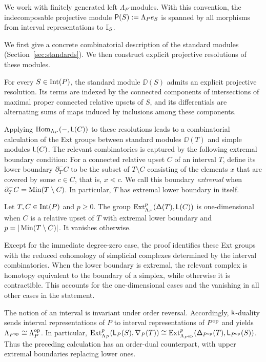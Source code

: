 We work with finitely generated left $\Lambda_P$-modules.  With this
convention, the indecomposable projective module
$\mathsf P(S):=\Lambda_Pe_S$ is spanned by all morphisms from interval representations to $\mathbb I_S$.

We first give a concrete combinatorial description of the standard modules (Section~\ref{sec:standards}).  We then construct explicit projective resolutions of these modules.

\begin{theorem}
For every $S\in\operatorname{Int}(P)$, the standard module $\DD(S)$ admits an explicit
projective resolution.
Its terms are indexed by the connected components of intersections of
maximal proper connected relative upsets of $S$, and its differentials are
alternating sums of maps induced by inclusions among these components.
\end{theorem}

Applying $\operatorname{Hom}_{\Lambda_P}(-,\mathsf L(C))$ to these resolutions leads to a combinatorial calculation of the Ext groups between standard modules $\DD(T)$ and simple modules $\mathsf L(C)$.
The relevant combinatorics is captured by the following extremal boundary
condition:  For a connected relative upset $C$ of an interval $T$, define
its lower boundary $\partial_T^-C$ to be the subset of $T\setminus C$
consisting of the elements $x$ that are covered by some $c\in C$, that is,
$x\lessdot c$.  We call this boundary \emph{extremal} when
$\partial_T^-C=\operatorname{Min}(T\setminus C)$.  In particular, $T$ has extremal
lower boundary in itself.

\begin{theorem}
\label{intro:standard-simple-ext-formula}
Let $T,C\in\operatorname{Int}(P)$ and $p\geq0$.
The group
$\operatorname{Ext}^p_{\Lambda_P}(\mathsf\Delta(T),\mathsf L(C))$ is one-dimensional when
$C$ is a relative upset of $T$ with extremal lower boundary and
$p=|\operatorname{Min}(T\setminus C)|$.  It vanishes otherwise.
\end{theorem}

Except for the immediate degree-zero case, the proof identifies these Ext groups with the reduced
cohomology of simplicial complexes determined by the interval
combinatorics.  When the lower boundary is extremal, the relevant complex is homotopy
equivalent to the boundary of a simplex, while otherwise it is
contractible.  
This accounts for the one-dimensional cases and the vanishing in all other cases in the statement.


The notion of an interval is invariant under order reversal.  Accordingly,
$\mathsf{k}$-duality sends interval representations of $P$ to interval
representations of $P^{\mathrm{op}}$ and yields
$\Lambda_{P^{\mathrm{op}}}\cong\Lambda_P^{\mathrm{op}}$.  In particular,
$\operatorname{Ext}_{\Lambda_P}^p(\mathsf L_P(S),\mathsf\nabla_P(T))
\cong
\operatorname{Ext}_{\Lambda_{P^{\mathrm{op}}}}^p(\mathsf\Delta_{P^{\mathrm{op}}}(T),\mathsf L_{P^{\mathrm{op}}}(S))$.
Thus the preceding calculation has an order-dual counterpart, with upper
extremal boundaries replacing lower ones.


